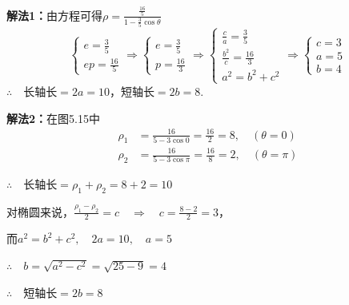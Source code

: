 \begin{solution}
\textbf{解法1：}由方程可得$\rho=\frac{\frac{16}{5}}{1-\frac{3}{5}\cos\theta}$
\[\begin{cases}
    e=\frac{3}{5}\\[1.5ex]
    ep=\frac{16}{5}
\end{cases}\Rightarrow\begin{cases}
    e=\frac{3}{5}\\[1.5ex]
    p=\frac{16}{3}
\end{cases}\Rightarrow\begin{cases}
    \frac{c}{a}=\frac{3}{5}\\[1.5ex]
    \frac{b^2}{c}=\frac{16}{3}\\[1.5ex]
    a^2=b^2+c^2
\end{cases}\Rightarrow\begin{cases}
    c=3\\a=5\\b=4
\end{cases}\]
$\therefore\quad $长轴长$=2a=10$，短轴长$=2b=8$.    

\noindent
\begin{minipage}{.53\textwidth}
\CTEXindent
\textbf{解法2：}在图5.15中
\[\begin{split}
    \rho_1&=\frac{16}{5-3\cos 0}=\frac{16}{2}=8,\quad (\theta=0)\\
    \rho_2&=\frac{16}{5-3\cos\pi}=\frac{16}{8}=2,\quad (\theta=\pi)
\end{split}\]
\end{minipage}
\hfill
\begin{minipage}{.45\textwidth}
\centering
{}
\end{minipage}

$\therefore\quad $长轴长$=\rho_1+\rho_2=8+2=10$

对椭圆来说，$\frac{\rho_1-\rho_2}{2}=c\quad \Rightarrow\quad c=\frac{8-2}{2}=3$，

而$a^2=b^2+c^2,\quad 2a=10,\quad a=5$

$\therefore\quad b=\sqrt{a^2-c^2}=\sqrt{25-9}=4$

$\therefore\quad$短轴长$=2b=8$

\end{solution}

